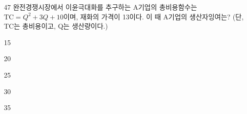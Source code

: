 \begin{question}{47}
완전경쟁시장에서 이윤극대화를 추구하는 A기업의 총비용함수는 $\mathrm{TC} = Q^{2} + 3Q + 10$이며, 재화의 가격이 13이다. 이 때 A기업의 생산자잉여는? (단, TC는 총비용이고, Q는 생산량이다.)
\begin{choices}
  \item 15
  \item 20
  \item 25
  \item 30
  \item 35
\end{choices}
\end{question}
